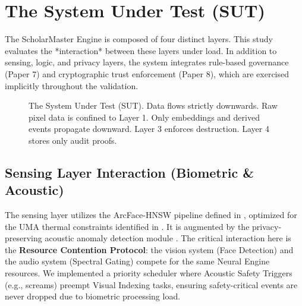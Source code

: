 \documentclass[conference]{IEEEtran}
\begin{document}
\section{The System Under Test (SUT)}
The ScholarMaster Engine is composed of four distinct layers. This study evaluates the *interaction* between these layers under load. In addition to sensing, logic, and privacy layers, the system integrates rule-based governance (Paper 7) and cryptographic trust enforcement (Paper 8), which are exercised implicitly throughout the validation.

\begin{figure}[htbp]
\centering
{}
\caption{The System Under Test (SUT). Data flows strictly downwards. Raw pixel data is confined to Layer 1. Only embeddings and derived events propagate downward. Layer 3 enforces destruction. Layer 4 stores only audit proofs.}
\label{fig:sut_arch}
\end{figure}

\subsection{Sensing Layer Interaction (Biometric \& Acoustic)}
The sensing layer utilizes the ArcFace-HNSW pipeline defined in \cite{p1}, optimized for the UMA thermal constraints identified in \cite{p5}. It is augmented by the privacy-preserving acoustic anomaly detection module \cite{p6}. The critical interaction here is the \textbf{Resource Contention Protocol}: the vision system (Face Detection) and the audio system (Spectral Gating) compete for the same Neural Engine resources. We implemented a priority scheduler where Acoustic Safety Triggers (e.g., screams) preempt Visual Indexing tasks, ensuring safety-critical events are never dropped due to biometric processing load.
\end{document}
